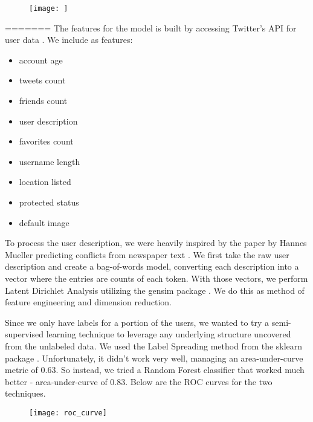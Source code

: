 \documentclass[10pt,a4paper]{article} %
\begin{document}
\begin{figure}[h]
\texttt{[image: ]}
\centering
\end{figure}
	
=======
		\noindent The features for the model is built by accessing Twitter's API for user data \cite{twitter}. We include as features:
		
			\begin{multicols}{3}
				\begin{itemize}
					\item account age
					\item tweets count
					\item friends count
					\item user description
					\item favorites count
					\item username length					
					\item location listed
					\item protected status
					\item default image
				\end{itemize}
			\end{multicols}
		
		To process the user description, we were heavily inspired by the paper by Hannes Mueller predicting conflicts from newspaper text \cite{mueller_rauh_2018}.  We first take the raw user description and create a bag-of-words model, converting each description into a vector where the entries are counts of each token.  With those vectors, we perform Latent Dirichlet Analysis utilizing the gensim package \cite{rehurek_lrec}.  We do this as method of feature engineering and dimension reduction.
		
		Since we only have labels for a portion of the users, we wanted to try a semi-supervised learning technique to leverage any underlying structure uncovered from the unlabeled data.  We used the Label Spreading method from the sklearn package \cite{scikit-learn}.  Unfortunately, it didn't work very well, managing an area-under-curve metric of 0.63.  So instead, we tried a Random Forest classifier that worked much better - area-under-curve of 0.83.  Below are the ROC curves for the two techniques.
		
		\begin{figure}[h!]
			\texttt{[image: roc\_curve]}
			\centering
		\end{figure}
	
	\pagebreak 
	
\end{document}
